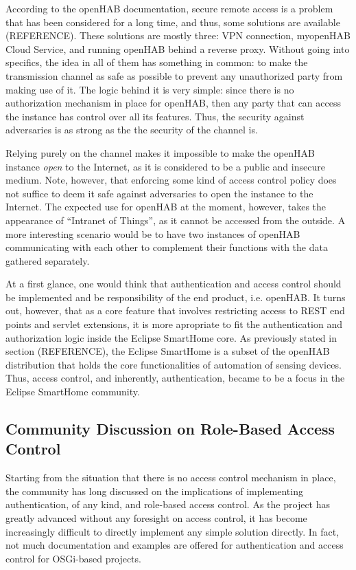 \documentclass[12pt]{article}
\newcommand{\TODO}{\todo[inline]}
\begin{document}
According to the openHAB documentation, secure remote access is a problem that has been considered for a long time, and thus, some solutions are available (REFERENCE). These solutions are mostly three: VPN connection, myopenHAB Cloud Service, and running openHAB behind a reverse proxy. Without going into specifics, the idea in all of them has something in common: to make the transmission channel as safe as possible to prevent any unauthorized party from making use of it. The logic behind it is very simple: since there is no authorization mechanism in place for openHAB, then any party that can access the instance has control over all its features. Thus, the security against adversaries is as strong as the the security of the channel is.

Relying purely on the channel makes it impossible to make the openHAB instance \emph{open} to the Internet, as it is considered to  be a public and insecure medium. Note, however, that enforcing some kind of access control policy does not suffice to deem it safe against adversaries to open the instance to the Internet. The expected use for openHAB at the moment, however, takes the appearance of ``Intranet of Things'', as it cannot be accessed from the outside. A more interesting scenario would be to have two instances of openHAB communicating with each other to complement their functions with the data gathered separately.

At a first glance, one would think that authentication and access control should be implemented and be responsibility of the end product, i.e. openHAB. It turns out, however, that as a core feature that involves restricting access to REST end points and servlet extensions, it is more apropriate to fit the authentication and authorization logic inside the Eclipse SmartHome core. As previously stated in section (REFERENCE), the Eclipse SmartHome is a subset of the openHAB distribution that holds the core functionalities of automation of sensing devices. Thus, access control, and inherently, authentication, became to be a focus in the Eclipse SmartHome community. 

\subsection{Community Discussion on Role-Based Access Control}
\label{ssec:discussion}
\TODO{https://github.com/eclipse/smarthome/issues/579}
Starting from the situation that there is no access control mechanism in place, the community has long discussed on the implications of implementing authentication, of any kind, and role-based access control. As the project has greatly advanced without any foresight on access control, it has become increasingly difficult to directly implement any simple solution directly. In fact, not much documentation and examples are offered for authentication and access control for OSGi-based projects.
\end{document}
